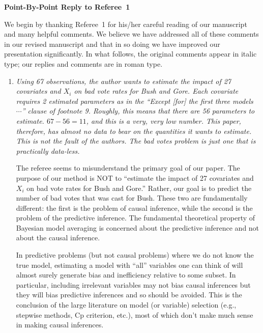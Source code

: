 \documentclass[11pt]{article}
\begin{document}

\begin{center}
  {\bf \Large Point-By-Point Reply to Referee~1}
\end{center}

We begin by thanking Referee~1 for his/her careful reading of our
manuscript and many helpful comments. We believe we have addressed all
of these comments in our revised manuscript and that in so doing we
have improved our presentation significantly.  In what follows, the
original comments appear in italic type; our replies and comments are
in roman type.

\bigskip
{}

\begin{enumerate}
  
\item {\it Using 67 observations, the author wants to estimate the
    impact of 27 covariates and $X_i$ on bad vote rates for Bush and
    Gore.  Each covariate requires 2 estimated parameters as in the
    ``Except [for] the first three models $\cdots$'' clause of
    footnote 9.  Roughly, this means that there are 56 parameters to
    estimate.  $67-56=11$, and this is a very, very low number. This
    paper, therefore, has almost no data to bear on the quantities it
    wants to estimate.  This is not the fault of the authors.  The bad
    votes problem is just one that is practically data-less.}
  
  The referee seems to misunderstand the primary goal of our paper.
  The purpose of our method is NOT to ``estimate the impact of 27
  covariates and $X_i$ on bad vote rates for Bush and Gore.'' Rather,
  our goal is to predict the number of bad votes that was cast for
  Bush. These two are fundamentally different: the first is the
  problem of causal inference, while the second is the problem of the
  predictive inference. The fundamental theoretical property of
  Bayesian model averaging is concerned about the predictive inference
  and not about the causal inference. 
  
  In predictive problems (but not causal problems) where we do not
  know the true model, estimating a model with ``all'' variables one
  can think of will almost surely generate bias and inefficiency
  relative to some subset.  In particular, including irrelevant
  variables may not bias causal inferences but they will bias
  predictive inferences and so should be avoided.  This is the
  conclusion of the large literature on model (or variable) selection
  (e.g., stepwise methods, Cp criterion, etc.), most of which don't
  make much sense in making causal inferences. 
  

\end{enumerate}
\end{document}
